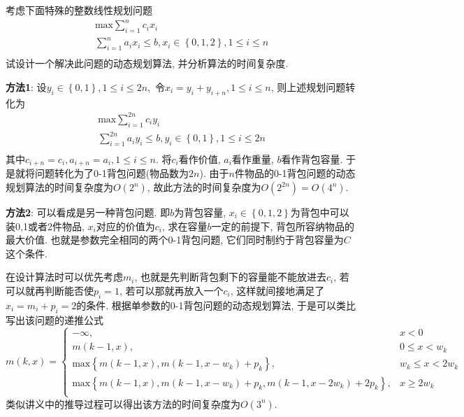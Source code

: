 \documentclass{article}
\begin{document}
\begin{homeworkProblem}
	考虑下面特殊的整数线性规划问题
	$$
	\begin{array}{l}
		\displaystyle \text{max}  \sum_{i=1}^n{c_ix_i}\\
		\displaystyle \sum_{i=1}^n{a_ix_i\le b, x_i\in \left\{ 0,1,2 \right\} ,1\le i\le n}\\
	\end{array}
	$$
	试设计一个解决此问题的动态规划算法, 并分析算法的时间复杂度.
	
	\solution \textbf{方法1}: 设$y_i\in \left\{ 0,1 \right\} ,1\le i\le 2n,$ 令$x_i=y_i+y_{i+n},1\leq i \leq n$, 则上述规划问题转化为
	$$
	\begin{array}{l}
		\displaystyle \text{max}  \sum_{i=1}^{2n}{c_iy_i}\\
		\displaystyle \sum_{i=1}^{2n}{a_iy_i\le b, y_i\in \left\{ 0,1 \right\} ,1\le i\le 2n}\\
	\end{array}
	$$
	其中$c_{i+n}=c_i,a_{i+n}=a_i,1\leq i \leq n$. 将$c_i$看作价值, $a_i$看作重量, $b$看作背包容量. 于是就将问题转化为了0-1背包问题(物品数为$2n$). 由于$n$件物品的0-1背包问题的动态规划算法的时间复杂度为$O\left( 2^n \right)$, 故此方法的时间复杂度为$O\left( 2^{2n} \right) =O\left( 4^n \right) $.

	\textbf{方法2}: 可以看成是另一种背包问题. 即$b$为背包容量, $x_i\in \left\{ 0,1,2 \right\}$为背包中可以装0,1或者2件物品, $x_i$对应的价值为$c_i$, 求在容量$b$一定的前提下, 背包所容纳物品的最大价值. 也就是参数完全相同的两个0-1背包问题, 它们同时制约于背包容量为$C$这个条件.

	在设计算法时可以优先考虑$m_i$, 也就是先判断背包剩下的容量能不能放进去$c_i$, 若可以就再判断能否使$p_i=1$, 若可以那就再放入一个$c_i$, 这样就间接地满足了$x_i=m_i+p_i=2$的条件. 根据单参数的0-1背包问题的动态规划算法, 于是可以类比写出该问题的递推公式
	$$
	m\left(k,x\right)=\begin{cases}
		-\infty,&		x<0\\
		m\left( k-1,x \right),&		0\le x<w_k\\
		\text{max} \left\{ m\left( k-1,x \right) ,m\left( k-1,x-w_k \right) +p_k \right\},&		w_k\le x<2w_k\\
		\text{max} \left\{ m\left( k-1,x \right) ,m\left( k-1,x-w_k \right) +p_k,m\left( k-1,x-2w_k \right) +2p_k \right\},&		x\ge 2w_k\\
	\end{cases}
	$$
	类似讲义中的推导过程可以得出该方法的时间复杂度为$O\left( 3^n \right)$.
\end{homeworkProblem}
\end{document}
